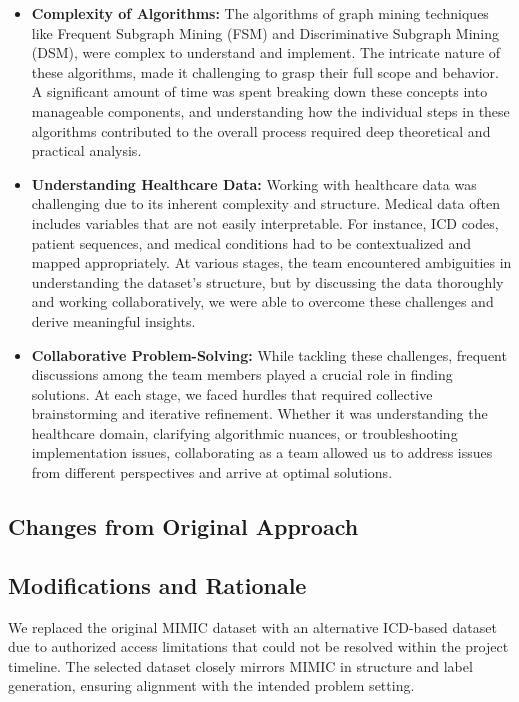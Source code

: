 \documentclass[11pt]{article}
\begin{document}
\begin{itemize}
    \item \textbf{Complexity of Algorithms:} The algorithms of graph mining techniques like Frequent Subgraph Mining (FSM) and Discriminative Subgraph Mining (DSM), were complex to understand and implement. The intricate nature of these algorithms, made it challenging to grasp their full scope and behavior. A significant amount of time was spent breaking down these concepts into manageable components, and understanding how the individual steps in these algorithms contributed to the overall process required deep theoretical and practical analysis.
    
    \item \textbf{Understanding Healthcare Data:} Working with healthcare data was challenging due to its inherent complexity and structure. Medical data often includes variables that are not easily interpretable. For instance, ICD codes, patient sequences, and medical conditions had to be contextualized and mapped appropriately. At various stages, the team encountered ambiguities in understanding the dataset's structure, but by discussing the data thoroughly and working collaboratively, we were able to overcome these challenges and derive meaningful insights.
    
    \item \textbf{Collaborative Problem-Solving:} While tackling these challenges, frequent discussions among the team members played a crucial role in finding solutions. At each stage, we faced hurdles that required collective brainstorming and iterative refinement. Whether it was understanding the healthcare domain, clarifying algorithmic nuances, or troubleshooting implementation issues, collaborating as a team allowed us to address issues from different perspectives and arrive at optimal solutions.
\end{itemize}

\subsection{Changes from Original Approach}
\subsection*{Modifications and Rationale}
We replaced the original MIMIC dataset with an alternative ICD-based dataset due to authorized access limitations that could not be resolved within the project timeline. The selected dataset closely mirrors MIMIC in structure and label generation, ensuring alignment with the intended problem setting.
\end{document}
